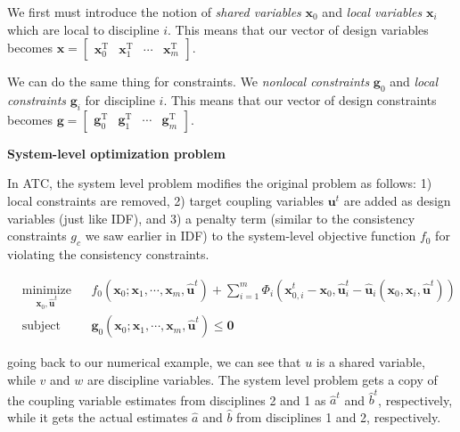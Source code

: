 \documentclass[11pt]{article}
\begin{document}
We first must introduce the notion of \emph{shared variables}
\(\mathbf{x}_0\) and \emph{local variables} \(\mathbf{x}_i\) which are
local to discipline \(i\). This means that our vector of design
variables becomes
\(\mathbf{x} = \begin{bmatrix} \mathbf{x}_0^\mathrm{T} & \mathbf{x}_1^\mathrm{T} & \cdots & \mathbf{x}_m^\mathrm{T} \end{bmatrix}\).

We can do the same thing for constraints. We \emph{nonlocal constraints}
\(\mathbf{g}_0\) and \emph{local constraints} \(\mathbf{g}_i\) for
discipline \(i\). This means that our vector of design constraints
becomes
\(\mathbf{g} = \begin{bmatrix} \mathbf{g}_0^\mathrm{T} & \mathbf{g}_1^\mathrm{T} & \cdots & \mathbf{g}_m^\mathrm{T} \end{bmatrix}\).

\textbf{System-level optimization problem}

In ATC, the system level problem modifies the original problem as
follows: 1) local constraints are removed, 2) target coupling variables
\(\mathbf{u}^t\) are added as design variables (just like IDF), and 3) a
penalty term (similar to the consistency constraints \(g_c\) we saw
earlier in IDF) to the system-level objective function \(f_0\) for
violating the consistency constraints.

\begin{equation*}
    \begin{aligned}
        & \underset{\mathbf{x}_0,\hat{\mathbf{u}}^t}{\text{minimize}}
        & & f_0(\mathbf{x}_0;\mathbf{x}_1,\cdots,\mathbf{x}_m,\hat{\mathbf{u}}^t) + \sum_{i=1}^m \Phi_i(\mathbf{x}_{0,i}^t - \mathbf{x}_{0}, \hat{\mathbf{u}}_{i}^t - \hat{\mathbf{u}}_{i}(\mathbf{x}_0,\mathbf{x}_i,\hat{\mathbf{u}}^t))\\
        & \text{subject to}
        & & \mathbf{g}_{0}(\mathbf{x}_0;\mathbf{x}_1,\cdots,\mathbf{x}_m,\hat{\mathbf{u}}^t) \leq \mathbf{0}
    \end{aligned}
    \tag{7}
\end{equation*}

going back to our numerical example, we can see that \(u\) is a shared
variable, while \(v\) and \(w\) are discipline variables. The system
level problem gets a copy of the coupling variable estimates from
disciplines 2 and 1 as \(\hat{a}^t\) and \(\hat{b}^t\), respectively,
while it gets the actual estimates \(\hat{a}\) and \(\hat{b}\) from
disciplines 1 and 2, respectively.
\end{document}
